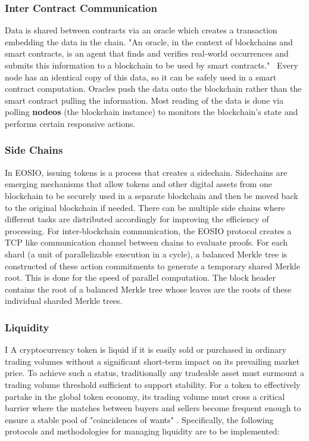 \documentclass[]{article}
\begin{document}
{\begin{enumerate}
		
\end{enumerate}
	 
	\subsubsection{Inter Contract Communication}
	Data is shared between contracts via an oracle which creates a transaction embedding the data in the chain. "An oracle, in the context of blockchains and smart contracts, is an agent that finds and verifies real-world occurrences and submits this information to a blockchain to be used by smart contracts."\ 
	\cite{2}
	Every node has an identical copy of this data, so it can be safely used in a smart contract computation.
	Oracles push the data onto the blockchain rather than the smart contract pulling the information.
	Most reading of the data is done via polling \textbf{nodeos} (the blockchain instance) to monitors the blockchain's state and performs certain responsive actions. 
	
	\subsubsection{Side Chains}
	In EOSIO, issuing tokens is a process that creates a sidechain. 
	Sidechains are emerging mechanisms that allow tokens and other digital assets from one blockchain to be securely used in a separate blockchain and then be moved back to the original blockchain if needed. 
	There can be multiple side chains where different tasks are distributed accordingly for improving the efficiency of processing.     
	For inter-blockchain communication, the EOSIO protocol creates a TCP like communication channel between chains to evaluate proofs.
	For each shard (a unit of parallelizable execution in a cycle), a balanced Merkle tree is constructed of these action commitments to generate a temporary shared Merkle root. 
	This is done for the speed of parallel computation. 
	The block header contains the root of a balanced Merkle tree whose leaves are the roots of these individual sharded Merkle trees.
	\cite{3} 
	
	
	\subsubsection{Liquidity}
	I
	 A cryptocurrency token is liquid if it is easily sold or purchased in ordinary trading volumes without a significant short-term impact on its prevailing market price. To achieve such a status, traditionally any tradeable asset must surmount a trading volume threshold sufficient to support stability. 
	 For a token to effectively partake in the global token economy, its trading volume must cross a critical barrier where the matches between buyers and sellers become frequent enough to ensure a stable pool of "coincidences of wants" \cite{10}. 
	 Specifically, the following protocols and methodologies for managing liquidity are to be implemented: 
  
}
\end{document}
